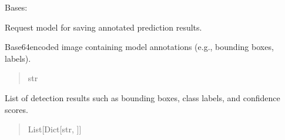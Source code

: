 \documentclass[letterpaper,10pt,english]{sphinxmanual}
\begin{document}

\begin{fulllineitems}
\label{\detokenize{modules/src.pig_sorting_api.main:src.pig_sorting_api.main.SavePredictionRequest}}
\pysigstartsignatures
\pysiglinewithargsret
{}
{\sphinxparamcomma {}}
{}
\pysigstopsignatures
\sphinxAtStartPar
Bases: 

\sphinxAtStartPar
Request model for saving annotated prediction results.

\begin{fulllineitems}
\label{\detokenize{modules/src.pig_sorting_api.main:src.pig_sorting_api.main.SavePredictionRequest.annotated_image}}
\pysigstartsignatures
\pysigline
{}
\pysigstopsignatures
\sphinxAtStartPar
Base64\sphinxhyphen{}encoded image containing model
annotations (e.g., bounding boxes, labels).
\begin{quote}\begin{description}
\sphinxAtStartPar
str

\end{description}\end{quote}

\end{fulllineitems}


\begin{fulllineitems}
\label{\detokenize{modules/src.pig_sorting_api.main:src.pig_sorting_api.main.SavePredictionRequest.detections}}
\pysigstartsignatures
\pysigline
{}
\pysigstopsignatures
\sphinxAtStartPar
List of detection results such
as bounding boxes, class labels, and confidence scores.
\begin{quote}\begin{description}
\sphinxAtStartPar
List{[}Dict{[}str, {\hyperref[\detokenize{modules/src.pig_sorting_api.main:src.pig_sorting_api.main.Any}]{}}{]}{]}


\end{description}
\end{quote}
\end{fulllineitems}
\end{fulllineitems}
\end{document}
